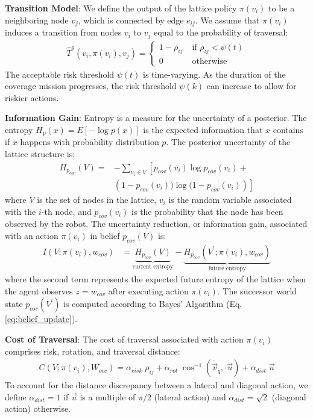 \documentclass[letterpaper]{article} %
\newcommand{\ph}[1]{{\textbf{#1}:}} %
\begin{document}
\ph{Transition Model} We define the output of the lattice policy $\pi(v_i)$ to be a neighboring node $v_j$, which is connected by edge $e_{ij}$. We assume that $\pi(v_i)$ induces a transition from nodes $v_i$ to $v_j$ equal to the probability of traversal:
\begin{align}
    \hat{T}^{g} (v_i, \pi(v_i), v_j) = \begin{cases} 
    1-\rho_{ij} \; &\text{if $\rho_{ij} < \psi(t)$}\\
    0 \; &\text{otherwise}
    \end{cases}
\end{align}
The acceptable risk threshold $\psi(t)$ is time-varying. As the duration of the coverage mission progresses, the risk threshold $\psi(k)$ can increase to allow for riskier actions.

\ph{Information Gain} Entropy is a measure for the uncertainty of a posterior. The entropy $H_p(x) = E[-\log p(x)]$ is the expected information that $x$ contains if $x$ happens with probability distribution $p$. The posterior uncertainty of the lattice structure is:
\begin{align}
    H_{p_{cov}}(V) =& 
    -\sum_{v_i \in V} \left[ p_{cov}(v_i) \log p_{cov}(v_i) + \right. \nonumber \\
      & \left. \left(1-p_{cov}(v_i)) \log (1-p_{cov}(v_i)\right) \right]
\end{align}
where $V$ is the set of nodes in the lattice, $v_i$ is the random variable associated with the $i$-th node, and $p_{cov}(v_i)$ is the probability that the node has been observed by the robot. The uncertainty reduction, or information gain, associated with an action $\pi(v_i)$ in belief $p_{cov}(V)$ is:
\begin{align}
    I(V; \pi(v_i), w_{cov}) &= \underbrace{H_{p_{cov}}(V)}_\text{current entropy} - \underbrace{H_{p_{cov}}(V^\prime; \pi(v_i), w_{cov})}_\text{future entropy}
\end{align}
where the second term represents the expected future entropy of the lattice when the agent observes $z = w_{cov}$ after executing action $\pi(v_i)$. The successor world state $p_{cov}(V^\prime)$ is computed according to Bayes' Algorithm (Eq. \ref{eq:belief_update}). 

\ph{Cost of Traversal} The cost of traversal associated with action $\pi(v_i)$ comprises risk, rotation, and traversal distance:
\begin{align}
    C(V; \pi(v_i), W_{occ}) = \alpha_{risk} \; \rho_{ij} + \alpha_{rot} \;  \cos^{-1}(\dot{\vec{v}}_q, \cdot \vec{u}) + \alpha_{dist} \; \vec{u}
    \label{eq:traversal_cost}
\end{align}
To account for the distance discrepancy between a lateral and diagonal action, we define $\alpha_{dist}=1$ if $\vec{u}$ is a multiple of $\pi/2$ (lateral action) and $\alpha_{dist}=\sqrt{2}$ (diagonal action) otherwise.
\end{document}
